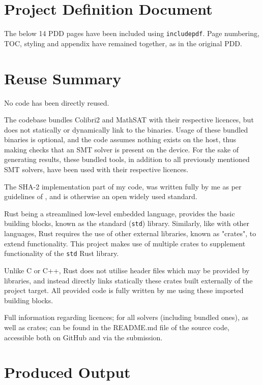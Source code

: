 \documentclass[a4paper]{report}
\begin{document}
\begin{appendices}
	\chapter{Project Definition Document}
	\label{chap:pdd}
	The below 14 PDD pages have been included using \texttt{includepdf}.
	Page numbering, TOC, styling and appendix have remained together, as in the original PDD.
	

	\chapter{Reuse Summary}
	No code has been directly reused.

	The codebase bundles Colibri2 and MathSAT with their respective licences, but does not statically or dynamically link to the binaries.
	Usage of these bundled binaries is optional, and the code assumes nothing exists on the host, thus making checks that an SMT solver is present on the device.
	For the sake of generating results, these bundled tools, in addition to all previously mentioned SMT solvers, have been used with their respective licences.

	The SHA-2 implementation part of my code, was written fully by me as per guidelines of \cite{NIST_SP_180_4}, and is otherwise an open widely used standard.

	Rust being a streamlined low-level embedded language, provides the basic building blocks, known as the standard (\texttt{std}) library.
	Similarly, like with other languages, Rust requires the use of other external libraries, known as "crates", to extend functionality.
	This project makes use of multiple crates to supplement functionality of the \texttt{std} Rust library.

	Unlike C or C++, Rust does not utilise header files which may be provided by libraries, and instead directly links statically these crates built externally of the project target.
	All provided code is fully written by me using these imported building blocks.

	Full information regarding licences; for all solvers (including bundled ones), as well as crates; can be found in the README.md file of the source code, accessible both on GitHub and via the submission.


	\chapter{Produced Output}

\end{appendices}
\end{document}
